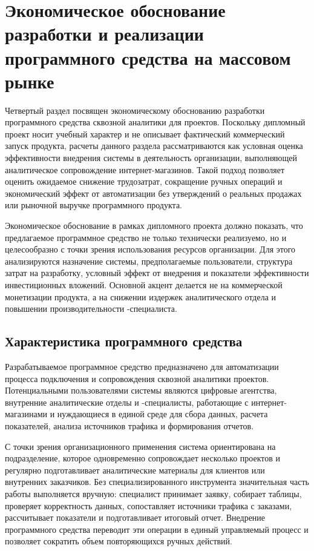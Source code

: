 \section{Экономическое обоснование разработки и реализации программного средства на массовом рынке}

Четвертый раздел посвящен экономическому обоснованию разработки программного средства сквозной аналитики для  проектов. Поскольку дипломный проект носит учебный характер и не описывает фактический коммерческий запуск продукта, расчеты данного раздела рассматриваются как условная оценка эффективности внедрения системы в деятельность организации, выполняющей аналитическое сопровождение интернет-магазинов. Такой подход позволяет оценить ожидаемое снижение трудозатрат, сокращение ручных операций и экономический эффект от автоматизации без утверждений о реальных продажах или рыночной выручке программного продукта.

Экономическое обоснование в рамках дипломного проекта должно показать, что предлагаемое программное средство не только технически реализуемо, но и целесообразно с точки зрения использования ресурсов организации. Для этого анализируются назначение системы, предполагаемые пользователи, структура затрат на разработку, условный эффект от внедрения и показатели эффективности инвестиционных вложений. Основной акцент делается не на коммерческой монетизации продукта, а на снижении издержек аналитического отдела и повышении производительности -специалиста.

\subsection{Характеристика программного средства}

Разрабатываемое программное средство предназначено для автоматизации процесса подключения и сопровождения сквозной аналитики  проектов. Потенциальными пользователями системы являются цифровые агентства, внутренние аналитические отделы и -специалисты, работающие с интернет-магазинами и нуждающиеся в единой среде для сбора данных, расчета показателей, анализа источников трафика и формирования отчетов.

С точки зрения организационного применения система ориентирована на подразделение, которое одновременно сопровождает несколько проектов и регулярно подготавливает аналитические материалы для клиентов или внутренних заказчиков. Без специализированного инструмента значительная часть работы выполняется вручную: специалист принимает заявку, собирает таблицы, проверяет корректность данных, сопоставляет источники трафика с заказами, рассчитывает показатели и подготавливает итоговый отчет. Внедрение программного средства переводит эти операции в единый управляемый процесс и позволяет сократить объем повторяющихся ручных действий.

